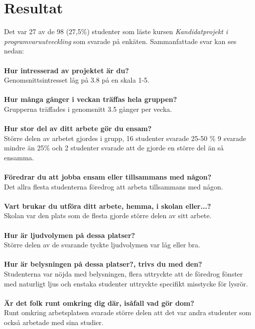 \section{Resultat}
\label{sec:results-hampus}

Det var 27 av de 98 (27,5\%) studenter som läste kursen \textit{Kandidatprojekt i programvaruutveckling} som svarade på enkäten. Sammanfattade svar kan ses nedan:\\
\\\textbf{Hur intresserad av projektet är du?}\\ 
Genomsnittsintresset låg på 3.8 på en skala 1-5.\\\\
\textbf{Hur många gånger i veckan träffas hela gruppen?}\\
Grupperna träffades i genomsnitt 3.5 gånger per vecka.\\\\
\textbf{Hur stor del av ditt arbete gör du ensam?}\\
Större delen av arbetet gjordes i grupp, 16 studenter svarade 25-50 \% 9 svarade  mindre än 25\% och 2 studenter svarade att de gjorde en större del än så ensamma.\\\\
\textbf{Föredrar du att jobba ensam eller tillsammans med någon?}\\
Det allra flesta studenterna föredrog att arbeta tillsammans med någon.\\\\
\textbf{Vart brukar du utföra ditt arbete, hemma, i skolan eller...?}\\
Skolan var den plats som de flesta gjorde större delen av sitt arbete. \\\\
\textbf{Hur är ljudvolymen på dessa platser?}\\
Större delen av de svarande tyckte ljudvolymen var låg eller bra.\\\\
\textbf{Hur är belysningen på dessa platser?, trivs du med den?}\\
Studenterna var nöjda med belysningen, flera uttryckte att de föredrog fönster med naturligt ljus och enstaka studenter uttryckte specifikt misstycke för lysrör.\\\\
\textbf{Är det folk runt omkring dig där, isåfall vad gör dom?}\\
Runt omkring arbetsplatsen svarade större delen att det var andra studenter som också arbetade med sina studier.\\\\
